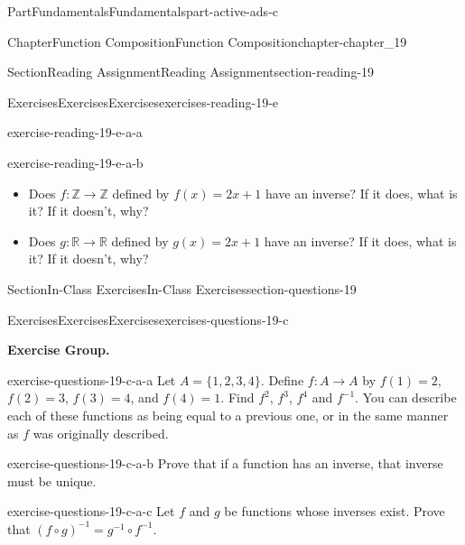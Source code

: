 \documentclass[oneside,10pt,]{book}
\numberwithin{equation}{section}
\begin{document}
\begin{partptx}{Part}{Fundamentals}{}{Fundamentals}{}{}{part-active-ads-c}
\begin{chapterptx}{Chapter}{Function Composition}{}{Function Composition}{}{}{chapter-chapter_19}
\begin{sectionptx}{Section}{Reading Assignment}{}{Reading Assignment}{}{}{section-reading-19}
\begin{exercises-subsection-numberless}{Exercises}{Exercises}{}{Exercises}{}{}{exercises-reading-19-e}
\begin{exercisegroup}
\begin{divisionexerciseeg}{1}{}{}{exercise-reading-19-e-a-a}
\end{divisionexerciseeg}%
\begin{divisionexerciseeg}{2}{}{}{exercise-reading-19-e-a-b}%
%
\begin{itemize}[label=\textbullet]
\item{}Does \(f:\mathbb{Z} \rightarrow \mathbb{Z}\) defined by \(f(x)=2x+1\) have an inverse? If it does, what is it? If it doesn't, why?%
\item{}Does \(g:\mathbb{R} \rightarrow \mathbb{R}\) defined by \(g(x)=2x+1\) have an inverse? If it does, what is it? If it doesn't, why?%
\end{itemize}
%
\end{divisionexerciseeg}%
\end{exercisegroup}
\par\medskip\noindent
\end{exercises-subsection-numberless}
\end{sectionptx}
%
%
\typeout{************************************************}
\typeout{************************************************}
%
\begin{sectionptx}{Section}{In-Class Exercises}{}{In-Class Exercises}{}{}{section-questions-19}
%
%
%
\typeout{************************************************}
\typeout{************************************************}
%
\begin{exercises-subsection-numberless}{Exercises}{Exercises}{}{Exercises}{}{}{exercises-questions-19-c}
\par\medskip\noindent%
\textbf{Exercise Group.}\space\space%
\begin{exercisegroup}
\begin{divisionexerciseeg}{1}{}{}{exercise-questions-19-c-a-a}%
Let \(A = \{1, 2, 3, 4\}\). Define \(f:A\rightarrow A\) by \(f(1) = 2\), \(f(2) = 3\), \(f(3) = 4\), and \(f(4) = 1\). Find \(f^2\), \(f^3\), \(f^4\) and \(f^{-1}\).  You can describe each of these functions as being equal to a previous one, or in the same manner as \(f\) was originally described.%
\end{divisionexerciseeg}%
\begin{divisionexerciseeg}{2}{}{}{exercise-questions-19-c-a-b}%
Prove that if a function has an inverse, that inverse must be unique.%
\end{divisionexerciseeg}%
\begin{divisionexerciseeg}{3}{}{}{exercise-questions-19-c-a-c}%
Let \(f\) and \(g\) be functions whose inverses exist. Prove that \((f\circ g)^{-1}= g^{-1}\circ f^{-1}\).%

\end{divisionexerciseeg}
\end{exercisegroup}
\end{exercises-subsection-numberless}
\end{sectionptx}
\end{chapterptx}
\end{partptx}
\end{document}
